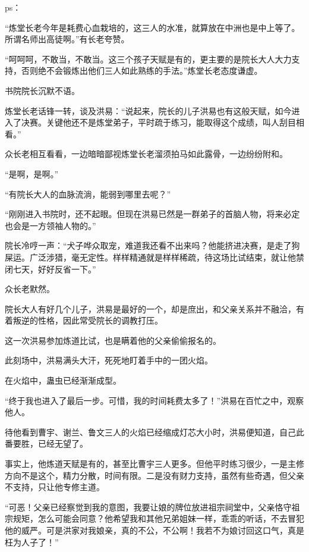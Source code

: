 
\begin{this_body}

ps：

“炼堂长老今年是耗费心血栽培的，这三人的水准，就算放在中洲也是中上等了。所谓名师出高徒啊。”有长老夸赞。

“呵呵呵，不敢当，不敢当。这三个孩子天赋是有的，更主要的是院长大人大力支持，否则绝不会锻炼出他们三人如此熟练的手法。”炼堂长老态度谦虚。

书院院长沉默不语。

炼堂长老话锋一转，谈及洪易：“说起来，院长的儿子洪易也有这般天赋，如今进入了决赛。关键他还不是炼堂弟子，平时疏于练习，能取得这个成绩，叫人刮目相看。”

众长老相互看看，一边暗暗鄙视炼堂长老溜须拍马如此露骨，一边纷纷附和。

“是啊，是啊。”

“有院长大人的血脉流淌，能弱到哪里去呢？”

“刚刚进入书院时，还不起眼。但现在洪易已然是一群弟子的首脑人物，将来必定也会是一方领袖人物的。”

院长冷哼一声：“犬子哗众取宠，难道我还看不出来吗？他能挤进决赛，是走了狗屎运。广泛涉猎，毫无定性。样样精通就是样样稀疏，待这场比试结束，就让他禁闭七天，好好反省一下。”

众长老默然。

院长大人有好几个儿子，洪易是最好的一个，却是庶出，和父亲关系并不融洽，有着叛逆的性格，因此常受院长的调教打压。

这一次洪易参加炼道比试，也是瞒着他的父亲偷偷报名的。

此刻场中，洪易满头大汗，死死地盯着手中的一团火焰。

在火焰中，蛊虫已经渐渐成型。

“终于我也进入了最后一步。可惜，我的时间耗费太多了！”洪易在百忙之中，观察他人。

待他看到曹宇、谢兰、鲁文三人的火焰已经缩成灯芯大小时，洪易便知道，自己此番要胜，已经无望了。

事实上，他炼道天赋是有的，甚至比曹宇三人更多。但他平时练习很少，一是主修方向不是这个，精力分散，时间有限。二是没有财力支持，虽然有些奇遇，但父亲不支持，只让他专修主道。

“可恶！父亲已经察觉到我的意图，我要让娘的牌位放进祖宗祠堂中，父亲恪守祖宗规矩，怎么可能会同意？他希望我和其他兄弟姐妹一样，乖乖的听话，不去冒犯他的威严。可是洪家对我娘亲，真的不公，不公啊！我若不为娘讨回这口气，真是枉为人子了！”


\end{this_body}
